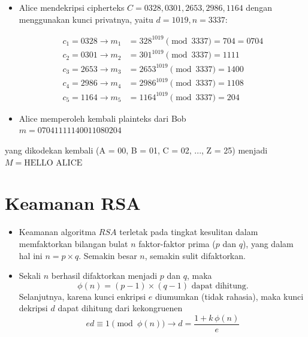 \documentclass{article}
\begin{document}
\newpage


\begin{flushright}\end{flushright}

\begin{itemize}
    \item Alice mendekripsi cipherteks $C = 0328, 0301, 2653, 2986, 1164$ dengan menggunakan kunci privatnya, yaitu $d = 1019, n = 3337$:
    
    \begin{align*}
    c_1 = 0328 \rightarrow m_1 &= 328^{1019} \pmod{3337} = 704 = 0704 \\
    c_2 = 0301 \rightarrow m_2 &= 301^{1019} \pmod{3337} = 1111 \\
    c_3 = 2653 \rightarrow m_3 &= 2653^{1019} \pmod{3337} = 1400 \\
    c_4 = 2986 \rightarrow m_4 &= 2986^{1019} \pmod{3337} = 1108 \\
    c_5 = 1164 \rightarrow m_5 &= 1164^{1019} \pmod{3337} = 204
    \end{align*}
    
    \item Alice memperoleh kembali plainteks dari Bob \\ $m = 07041111140011080204$
\end{itemize}

yang dikodekan kembali (A = 00, B = 01, C = 02, ..., Z = 25) menjadi \\ $M = \text{HELLO ALICE}$

\newpage


\section*{Keamanan RSA}

\begin{itemize}
    \item Keamanan algoritma $RSA$ terletak pada tingkat kesulitan dalam memfaktorkan bilangan bulat $n$ faktor-faktor prima ($p$ dan $q$), yang dalam hal ini $n = p \times q$. Semakin besar $n$, semakin sulit difaktorkan.
    \item Sekali $n$ berhasil difaktorkan menjadi $p$ dan $q$, maka
    \[ \phi(n) = (p - 1) \times (q - 1) \text{ dapat dihitung.} \]
    Selanjutnya, karena kunci enkripsi $e$ diumumkan (tidak rahasia), maka kunci dekripsi $d$ dapat dihitung dari kekongruenen
    \[ ed \equiv 1 \pmod{\phi(n)} \rightarrow d = \frac{1 + k \, \phi(n)}{e} \]
\end{itemize}
\end{document}
